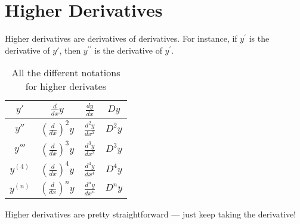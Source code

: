 \documentclass[../main.tex]{subfiles}
\begin{document}
\chapter{Higher Derivatives}
Higher derivatives are derivatives of derivatives. 
For instance, if $y^\prime$ is the derivative of $y'$, 
then $y^{\prime\prime}$ is the derivative of $y^\prime$.
\begin{table}[h]
    \centering
    \caption{All the different notations for higher derivates}
    \label{tab:notations}
    \begin{tabular}{c|c|c|c}
    $y'$      & $\frac{d}{dx}y$                   & $\frac{dy}{dx}$     & $Dy$   \\ \hline
    $y''$     & $\left( \frac{d}{dx} \right)^2 y$ & $\frac{d^2y}{dx^2}$ & $D^2y$ \\ \hline
    $y'''$    & $\left( \frac{d}{dx} \right)^3 y$ & $\frac{d^3y}{dx^3}$ & $D^3y$ \\ \hline
    $y^{(4)}$ & $\left( \frac{d}{dx} \right)^4 y$ & $\frac{d^4y}{dx^4}$ & $D^4y$ \\ \hline
    $y^{(n)}$ & $\left( \frac{d}{dx} \right)^n y$ & $\frac{d^ny}{dx^n}$ & $D^ny$
    \end{tabular}
\end{table}

Higher derivatives are pretty straightforward --- 
just keep taking the derivative!
\end{document}
